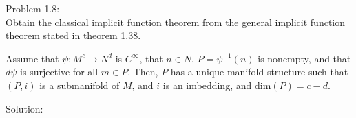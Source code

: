 \documentclass[paper=a4, fontsize=11pt]{scrartcl} %
\numberwithin{equation}{section} %
\numberwithin{figure}{section} %
\numberwithin{table}{section} %
\begin{document}
Problem 1.8:\\
Obtain the classical implicit function theorem from the general implicit function theorem stated in theorem 1.38.\\

\begin{theorem}[1.38]
Assume that $\psi:M^c \to N^d$ is $C^{\infty}$, that $n \in N$, $P=\psi^{-1}(n)$ is nonempty, and that $d\psi$ is surjective for all $m \in P$. 
Then, $P$ has a unique manifold structure such that $(P,i)$ is a submanifold of $M$, and $i$ is an imbedding, and $\mathrm{dim}(P)=c-d$.
\end{theorem}

Solution:\\


\end{document}
